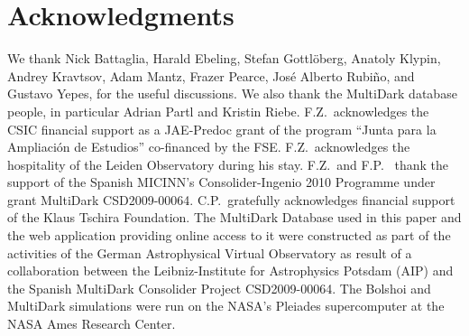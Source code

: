 \documentclass[useAMS,usenatbib]{mn2e}
\begin{document}
\section*{Acknowledgments}
We thank Nick Battaglia, Harald Ebeling, Stefan Gottl{\"o}berg, Anatoly Klypin,
Andrey Kravtsov, Adam Mantz, Frazer Pearce, Jos\'e Alberto Rubi\~no, and Gustavo
Yepes, for the useful discussions. We also thank the MultiDark database people,
in particular Adrian Partl and Kristin Riebe.  F.Z.{\ }acknowledges the CSIC
financial support as a JAE-Predoc grant of the program ``Junta para la
Ampliaci\'on de Estudios'' co-financed by the FSE.  F.Z.{\ }acknowledges the
hospitality of the Leiden Observatory during his stay.  F.Z.{\ }and F.P.{\ }
thank the support of the Spanish MICINN's Consolider-Ingenio 2010 Programme
under grant MultiDark CSD2009-00064. C.P.{\ }gratefully acknowledges financial
support of the Klaus Tschira Foundation. The MultiDark Database used in this
paper and the web application providing online access to it were constructed as
part of the activities of the German Astrophysical Virtual Observatory as result
of a collaboration between the Leibniz-Institute for Astrophysics Potsdam (AIP)
and the Spanish MultiDark Consolider Project CSD2009-00064. The Bolshoi and
MultiDark simulations were run on the NASA's Pleiades supercomputer at the NASA
Ames Research Center.






\label{lastpage}
\end{document}
